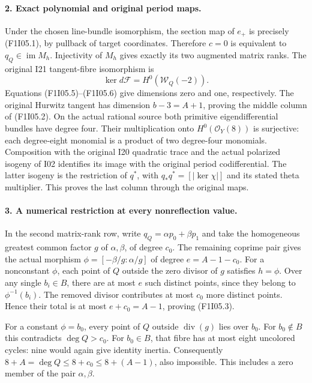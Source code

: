 \paragraph{2. Exact polynomial and original period maps.}
Under the chosen line-bundle isomorphism, the section map of
$e_+$ is precisely (F1I05.1), by pullback of target coordinates.
Therefore $c=0$ is equivalent to $q_Q\in\operatorname{im}M_h$.
Injectivity of $M_h$ gives exactly its two augmented matrix ranks.
The original I21 tangent-fibre isomorphism is
\[
              \ker d\mathcal F=H^0(\mathcal W_Q(-2)).
\]
Equations (F1I05.5)--(F1I05.6) give dimensions zero and one,
respectively. The original Hurwitz tangent has dimension
$b-3=A+1$, proving the middle column of (F1I05.2).
On the actual rational source both primitive eigendifferential
bundles have degree four. Their multiplication onto
$H^0(\mathcal O_Y(8))$ is surjective: each degree-eight monomial
is a product of two degree-four monomials. Composition with the
original I20 quadratic trace and the actual polarized isogeny
of I02 identifies its image with the original period
codifferential. The latter isogeny is the restriction of $q^*$,
with $q_*q^*=[|\ker\chi|]$ and its stated theta multiplier.
This proves the last column through the original maps.

\paragraph{3. A numerical restriction at every nonreflection value.}
In the second matrix-rank row, write
$q_Q=\alpha p_0+\beta p_1$ and take the homogeneous greatest
common factor $g$ of $\alpha,\beta$, of degree $c_0$.
The remaining coprime pair gives the actual morphism
$\phi=[-\beta/g:\alpha/g]$ of degree $e=A-1-c_0$.
For a nonconstant $\phi$, each point of $Q$ outside the
zero divisor of $g$ satisfies $h=\phi$. Over any single
$b_i\in B$, there are at most $e$ such distinct points,
since they belong to $\phi^{-1}(b_i)$. The removed divisor
contributes at most $c_0$ more distinct points. Hence their
total is at most $e+c_0=A-1$, proving (F1I05.3).

For a constant $\phi=b_0$, every point of $Q$ outside
$\operatorname{div}(g)$ lies over $b_0$. For $b_0\notin B$
this contradicts $\deg Q>c_0$. For $b_0\in B$, that fibre
has at most eight uncolored cycles: nine would again give
identity inertia. Consequently
$8+A=\deg Q\le8+c_0\le8+(A-1)$, also impossible.
This includes a zero member of the pair $\alpha,\beta$.

